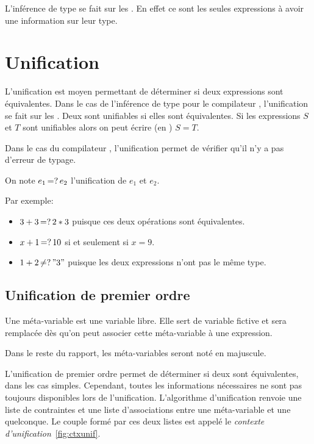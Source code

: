             L'inférence de type se fait sur les \lexp{}. En effet ce sont les seules expressions
            à avoir une information sur leur type.

    \section{Unification}
            L'unification est moyen permettant de déterminer si deux expressions sont équivalentes.
            Dans le cas de l'inférence de type pour le compilateur \typer{},
            l'unification se fait sur les \lexp{}.
            Deux \lexp{} sont unifiables si elles sont équivalentes. Si les expressions $S$ et $T$
            sont unifiables alors on peut écrire (en \typer{}) $S = T$.

            Dans le cas du compilateur \typer{}, l'unification permet de vérifier qu'il n'y a pas
            d'erreur de typage.

            On note $e_1 \operatorname{\mathbin{=?}} e_2$ l'unification de $e_1$ et $e_2$.

            Par exemple:
            \begin{itemize}
                \item $3 + 3 \operatorname{\mathbin{=?}} 2 * 3$ puisque ces deux opérations sont équivalentes.
                \item $x + 1 \operatorname{\mathbin{=?}} 10$ si et seulement si $x = 9$.
                \item $1 + 2 \operatorname{\mathbin{\neq?}} "3"$ puisque les deux expressions n'ont pas le même type.
            \end{itemize}

    \subsection{Unification de premier ordre}

                Une méta-variable est une variable libre. Elle sert de variable fictive et sera remplacée dès qu'on peut
                associer cette méta-variable à une expression.

                Dans le reste du rapport, les méta-variables seront noté en majuscule.

                L'unification de premier ordre permet de déterminer si deux \lexp{} sont équivalentes, dans les cas simples.
                Cependant, toutes les informations nécessaires ne sont pas toujours disponibles lors de l'unification.
                L'algorithme d'unification renvoie une liste de contraintes et une liste d'associations entre une méta-variable et une \lexp{} quelconque.
                Le couple formé par ces deux listes est appelé le \textit{contexte d'unification}~\ref{fig:ctxunif}.

